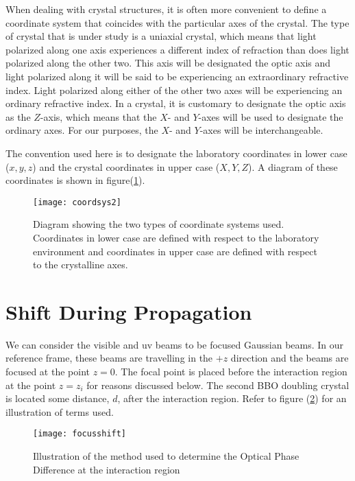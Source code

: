 When dealing with crystal structures, it is often more convenient
to define a coordinate system that coincides with the particular
axes of the crystal.  The type of crystal that is under study is a
uniaxial crystal, which means that light polarized along one axis
experiences a different index of refraction than does light
polarized along the other two.  This axis will be designated the
optic axis and light polarized along it will be said to be
experiencing an extraordinary refractive index. Light polarized
along either of the other two axes will be experiencing an
ordinary refractive index. In a crystal, it is customary to
designate the optic axis as the $Z$-axis, which means that the
$X$- and $Y$-axes will be used to designate the ordinary axes. For
our purposes, the $X$- and $Y$-axes will be interchangeable.

The convention used here is to designate the laboratory
coordinates in lower case ($x,y,z$) and the crystal coordinates in
upper case ($X,Y,Z$).  A diagram of these coordinates is shown in
figure(\ref{coord}).

\begin{figure}
\texttt{[image: coordsys2]}
\caption[Definition of coordinate systems used]{Diagram showing
the two types of coordinate systems used.  Coordinates in lower
case are defined with respect to the laboratory environment and
coordinates in upper case are defined with respect to the
crystalline axes.}
\label{coord}%
\end{figure}


\section{Shift During Propagation}
\label{phaseshiftff}

We can consider the visible and uv beams to be focused Gaussian
beams.  In our reference frame, these beams are travelling in the
$+z$ direction and the beams are focused at the point $z=0$. The
focal point is placed before the interaction region at the point
$z=z_i$ for reasons discussed below.  The second BBO doubling
crystal is located some distance, $d$, after the interaction
region.  Refer to figure (\ref{opdcalc}) for an illustration of
terms used.

\begin{figure}
\texttt{[image: focusshift]}
\caption[Method for determining interaction optical phase
Difference]{Illustration of the method used to determine the
Optical Phase Difference at the interaction region}
\label{opdcalc}
\end{figure}


